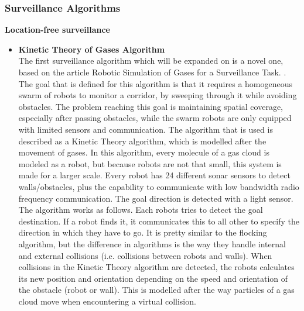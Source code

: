 \subsubsection{Surveillance Algorithms}

\textbf{Location-free surveillance}
\begin{itemize}
\item \textbf{Kinetic Theory of Gases Algorithm}\\
The first surveillance algorithm which will be expanded on is a novel one, based on the article Robotic Simulation of Gases for a Surveillance Task. \cite{Kerr2005}.
The goal that is defined for this algorithm is that it requires a homogeneous swarm of robots to monitor a corridor, by sweeping through it while avoiding obstacles. 
The problem reaching this goal is maintaining spatial coverage, especially after passing obstacles, while the swarm robots are only equipped with limited sensors and communication.
The algorithm that is used is described as a Kinetic Theory algorithm, which is modelled after the movement of gases. 
In this algorithm, every molecule of a gas cloud is modeled as a robot, but because robots are not that small, this system is made for a larger scale. 
Every robot has 24 different sonar sensors to detect walls/obstacles, plus the capability to communicate with low bandwidth radio frequency communication. 
The goal direction is detected with a light sensor.\\
The algorithm works as follows. Each robots tries to detect the goal destination. If a robot finds it, it communicates this to all other to specify the direction in which they have to go. 
It is pretty similar to the flocking algorithm, but the difference in algorithms is the way they handle internal and external collisions (i.e. collisions between robots and walls). 
When collisions in the Kinetic Theory algorithm are detected, the robots calculates its new position and orientation depending on the speed and orientation of the obstacle (robot or wall). 
This is modelled after the way particles of a gas cloud move when encountering a virtual collision. 

\end{itemize}

